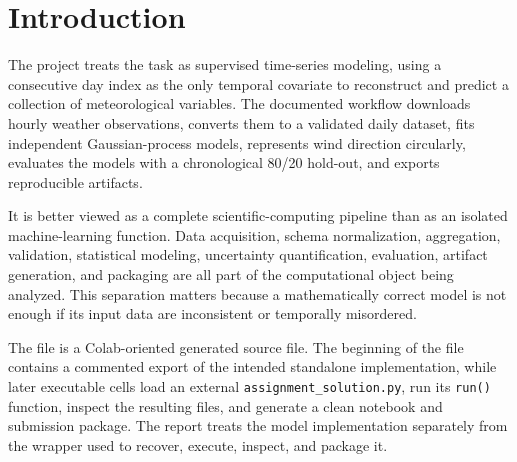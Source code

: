 \documentclass[11pt,a4paper]{article}
\newcommand{\code}[1]{\texttt{#1}}
\begin{document}
\section{Introduction}
The project treats the task as supervised time-series modeling, using a consecutive day index as the only temporal covariate to reconstruct and predict a collection of meteorological variables. The documented workflow downloads hourly weather observations, converts them to a validated daily dataset, fits independent Gaussian-process models, represents wind direction circularly, evaluates the models with a chronological 80/20 hold-out, and exports reproducible artifacts.

It is better viewed as a complete scientific-computing pipeline than as an isolated machine-learning function. Data acquisition, schema normalization, aggregation, validation, statistical modeling, uncertainty quantification, evaluation, artifact generation, and packaging are all part of the computational object being analyzed. This separation matters because a mathematically correct model is not enough if its input data are inconsistent or temporally misordered.

The file is a Colab-oriented generated source file. The beginning of the file contains a commented export of the intended standalone implementation, while later executable cells load an external \code{assignment\_solution.py}, run its \code{run()} function, inspect the resulting files, and generate a clean notebook and submission package. The report treats the model implementation separately from the wrapper used to recover, execute, inspect, and package it.
\end{document}
